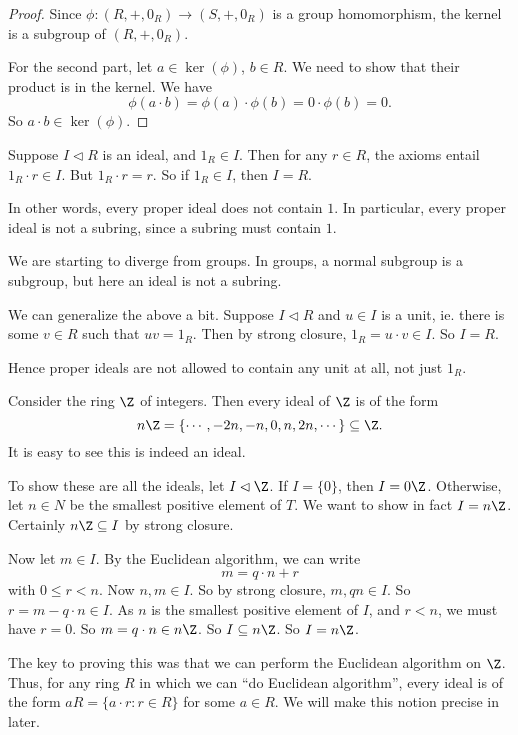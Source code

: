 \documentclass[a4paper]{article}
\begin{document}
\begin{proof}
  Since $\phi: (R, +, 0_R) \to (S, +, 0_R)$ is a group homomorphism, the kernel is a subgroup of $(R, +, 0_R)$.

  For the second part, let $a \in \ker(\phi)$, $b \in R$. We need to show that their product is in the kernel. We have
  \[
    \phi(a\cdot b) = \phi(a) \cdot \phi(b) = 0 \cdot \phi(b) = 0.
  \]
  So $a \cdot b \in \ker(\phi)$.
\end{proof}

\begin{eg}
  Suppose $I \lhd R$ is an ideal, and $1_R \in I$. Then for any $r \in R$, the axioms entail $1_R \cdot r \in I$. But $1_R \cdot r = r$. So if $1_R \in I$, then $I = R$.

  In other words, every proper ideal does not contain $1$. In particular, every proper ideal is not a subring, since a subring must contain $1$.
\end{eg}
We are starting to diverge from groups. In groups, a normal subgroup is a subgroup, but here an ideal is not a subring.

\begin{eg}
  We can generalize the above a bit. Suppose $I \lhd R$ and $u \in I$ is a unit, ie. there is some $v \in R$ such that $uv = 1_R$. Then by strong closure, $1_R = u \cdot v\in I$. So $I = R$.

  Hence proper ideals are not allowed to contain any unit at all, not just $1_R$.
\end{eg}

\begin{eg}
  Consider the ring $\Z$ of integers. Then every ideal of $\Z$ is of the form
  \[
    n\Z = \{\cdots, -2n, -n, 0, n, 2n, \cdots\} \subseteq \Z.
  \]
  It is easy to see this is indeed an ideal.

  To show these are all the ideals, let $I \lhd \Z$. If $I = \{0\}$, then $I = 0\Z$. Otherwise, let $n \in N$ be the smallest positive element of $T$. We want to show in fact $I = n\Z$. Certainly $n\Z \subseteq I$ by strong closure.

  Now let $m \in I$. By the Euclidean algorithm, we can write
  \[
    m = q \cdot n + r
  \]
  with $0 \leq r < n$. Now $n,m \in I$. So by strong closure, $m, qn \in I$. So $r = m - q\cdot n \in I$. As $n$ is the smallest positive element of $I$, and $r < n$, we must have $r = 0$. So $m = q\cdot n \in n\Z$. So $I \subseteq n\Z$. So $I = n\Z$.
\end{eg}
The key to proving this was that we can perform the Euclidean algorithm on $\Z$. Thus, for any ring $R$ in which we can ``do Euclidean algorithm'', every ideal is of the form $aR = \{a \cdot r: r \in R\}$ for some $a \in R$. We will make this notion precise in later.
\end{document}
